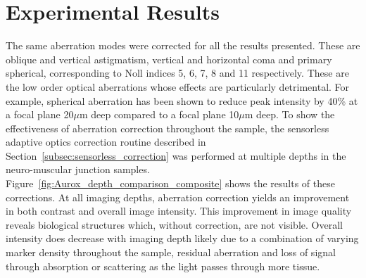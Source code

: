 \section{Experimental Results}
\label{sec:Aurox_results}

The same aberration modes were corrected for all the results presented. 
These are oblique and vertical astigmatism, vertical and horizontal coma 
and primary spherical, corresponding to Noll indices 5, 6, 7, 8 and 11 
respectively.\cite{noll1976zernike} These are the low order optical 
aberrations whose effects are particularly detrimental. For example, 
spherical aberration has been shown to reduce peak intensity by 40\% at
a focal plane 20$\mu$m deep compared to a focal plane 10$\mu$m 
deep.\cite{hell1993aberrations} To show the effectiveness of aberration 
correction throughout the sample, the sensorless adaptive optics correction
routine described in Section~\ref{subsec:sensorless_correction} was performed
at multiple depths in the neuro-muscular junction samples. Figure~\ref{fig:Aurox_depth_comparison_composite} shows the results of 
these corrections. At all imaging depths, aberration correction yields an 
improvement in both contrast and overall image intensity. This improvement 
in image quality reveals biological structures which, without correction, 
are not visible. Overall intensity does decrease with imaging depth likely 
due to a combination of varying marker density throughout the sample, 
residual aberration and loss of signal through absorption or scattering 
as the light passes through more tissue.

